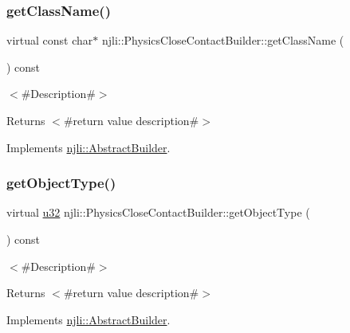 \subsubsection{\texorpdfstring{get\+Class\+Name()}{getClassName()}}
{\footnotesize\ttfamily virtual const char$\ast$ njli\+::\+Physics\+Close\+Contact\+Builder\+::get\+Class\+Name (\begin{DoxyParamCaption}{ }\end{DoxyParamCaption}) const\hspace{0.3cm}{\ttfamily [virtual]}}

$<$\#\+Description\#$>$

\begin{DoxyReturn}{Returns}
$<$\#return value description\#$>$ 
\end{DoxyReturn}


Implements \mbox{\hyperlink{classnjli_1_1_abstract_builder_a902f73ea78031b06aca183a417f3413b}{njli\+::\+Abstract\+Builder}}.

\mbox{\label{classnjli_1_1_physics_close_contact_builder_ae5f9f599e817990a58fb395da3eaa240}} 
\subsubsection{\texorpdfstring{get\+Object\+Type()}{getObjectType()}}
{\footnotesize\ttfamily virtual \mbox{\hyperlink{_util_8h_a10e94b422ef0c20dcdec20d31a1f5049}{u32}} njli\+::\+Physics\+Close\+Contact\+Builder\+::get\+Object\+Type (\begin{DoxyParamCaption}{ }\end{DoxyParamCaption}) const\hspace{0.3cm}{\ttfamily [virtual]}}

$<$\#\+Description\#$>$

\begin{DoxyReturn}{Returns}
$<$\#return value description\#$>$ 
\end{DoxyReturn}


Implements \mbox{\hyperlink{classnjli_1_1_abstract_builder_a0f2d344fcf697b167f4f2b1122b5fb33}{njli\+::\+Abstract\+Builder}}.

\mbox{\label{classnjli_1_1_physics_close_contact_builder_aecbb1136c71c0e2980b178f7b3b00272}} 
